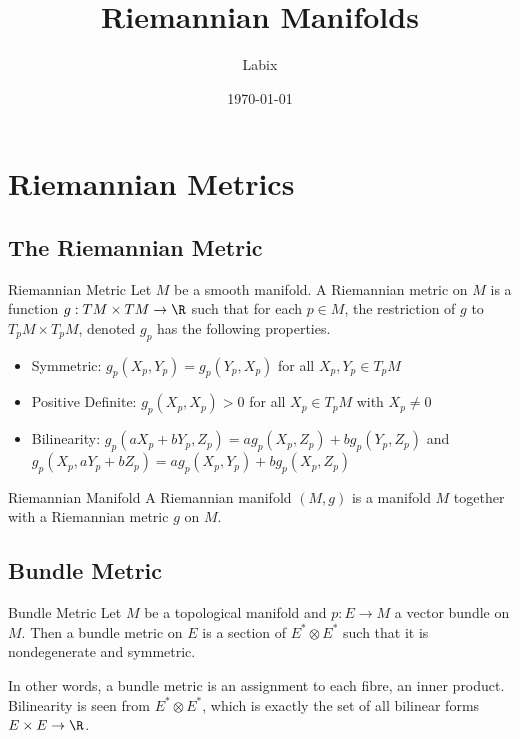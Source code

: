 \documentclass[a4paper]{article}
\title{Riemannian Manifolds}
\author{Labix}
\date{\today}
\begin{document}
\maketitle
\begin{abstract}
\end{abstract}
\pagebreak
\tableofcontents
\pagebreak

\section{Riemannian Metrics}
\subsection{The Riemannian Metric}
\begin{defn}{Riemannian Metric}{} Let $M$ be a smooth manifold. A Riemannian metric on $M$ is a function $g: TM\times TM\to\R$ such that for each $p\in M$, the restriction of $g$ to $T_pM\times T_pM$, denoted $g_p$ has the following properties. 
\begin{itemize}
\item Symmetric: $g_p(X_p,Y_p)=g_p(Y_p,X_p)$ for all $X_p,Y_p\in T_pM$
\item Positive Definite: $g_p(X_p,X_p)>0$ for all $X_p\in T_pM$ with $X_p\neq 0$
\item Bilinearity: $g_p(aX_p+bY_p,Z_p)=ag_p(X_p,Z_p)+bg_p(Y_p,Z_p)$ and $g_p(X_p,aY_p+bZ_p)=ag_p(X_p,Y_p)+bg_p(X_p,Z_p)$
\end{itemize}
\end{defn}

\begin{defn}{Riemannian Manifold}{} A Riemannian manifold $(M,g)$ is a manifold $M$ together with a Riemannian metric $g$ on $M$. 
\end{defn}

\subsection{Bundle Metric}
\begin{defn}{Bundle Metric}{} Let $M$ be a topological manifold and $p:E\to M$ a vector bundle on $M$. Then a bundle metric on $E$ is a section of $E^\ast\otimes E^\ast$ such that it is nondegenerate and symmetric. 
\end{defn}

In other words, a bundle metric is an assignment to each fibre, an inner product. Bilinearity is seen from $E^\ast\otimes E^\ast$, which is exactly the set of all bilinear forms $E\times E\to\R$. 
\end{document}
